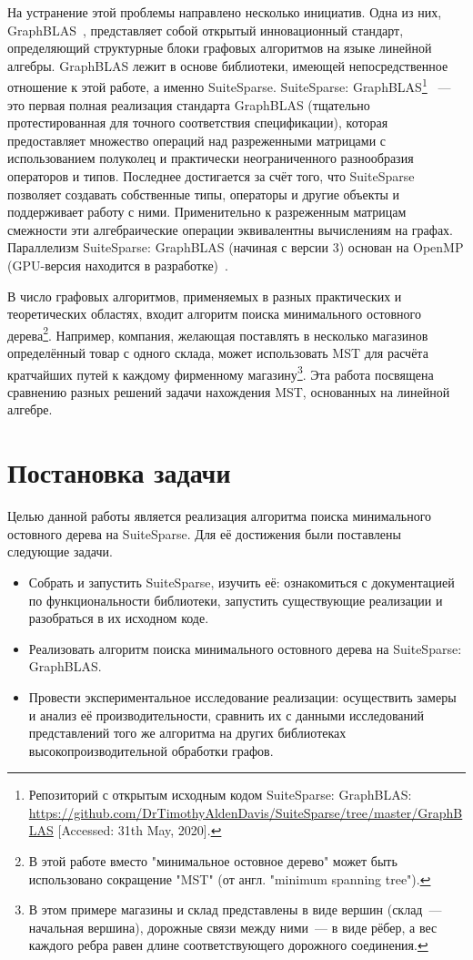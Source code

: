 \documentclass[14pt]{matmex-diploma-custom}
\begin{document}
На устранение этой проблемы направлено несколько инициатив. Одна из них, GraphBLAS~\cite{GraphBLAS}, представляет собой открытый инновационный стандарт, определяющий структурные блоки графовых алгоритмов на языке линейной алгебры. GraphBLAS лежит в основе библиотеки, имеющей непосредственное отношение к этой работе, а именно SuiteSparse. SuiteSparse: GraphBLAS\footnote{Репозиторий с открытым исходным кодом SuiteSparse: GraphBLAS: \url{https://github.com/DrTimothyAldenDavis/SuiteSparse/tree/master/GraphBLAS} [Accessed: 31th May, 2020].}~\cite{SuiteSparse1} --- это первая полная реализация стандарта GraphBLAS (тщательно протестированная для точного соответствия спецификации), которая предоставляет множество операций над разреженными матрицами с использованием полуколец и практически неограниченного разнообразия операторов и типов. Последнее достигается за счёт того, что SuiteSparse позволяет создавать собственные типы, операторы и другие объекты и поддерживает работу с ними. Применительно к разреженным матрицам смежности эти алгебраические операции эквивалентны вычислениям на графах. Параллелизм SuiteSparse: GraphBLAS (начиная с версии 3) основан на OpenMP (GPU-версия находится в разработке)~\cite{OpenMP}.

В число графовых алгоритмов, применяемых в разных практических и теоретических областях, входит алгоритм поиска минимального остовного дерева\footnote{В этой работе вместо "минимальное остовное дерево" может быть использовано сокращение "MST" (от англ. "minimum spanning tree").}. Например, компания, желающая поставлять в несколько магазинов определённый товар с одного склада, может использовать MST для расчёта кратчайших путей к каждому фирменному магазину\footnote{В этом примере магазины и склад представлены в виде вершин (склад~--- начальная вершина), дорожные связи между ними~--- в виде рёбер, а вес каждого ребра равен длине соответствующего дорожного соединения.}. Эта работа посвящена сравнению разных решений задачи нахождения MST, основанных на линейной алгебре.


\section{Постановка задачи}
Целью данной работы является реализация алгоритма поиска минимального остовного дерева на SuiteSparse. Для её достижения были поставлены следующие задачи.

\begin{itemize}
	\item Собрать и запустить SuiteSparse, изучить её: ознакомиться с документацией по функциональности библиотеки, запустить существующие реализации и разобраться в их исходном коде.
	\item Реализовать алгоритм поиска минимального остовного дерева на SuiteSparse: GraphBLAS.
	\item Провести экспериментальное исследование реализации: осуществить замеры и анализ её производительности, сравнить их с данными исследований представлений того же алгоритма на других библиотеках высокопроизводительной обработки графов.
\end{itemize}
\end{document}
